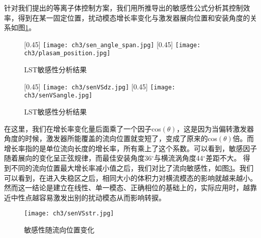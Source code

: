 针对我们提出的等离子体控制方案，我们用所推导出的敏感性公式分析其控制效率，得到在某一固定位置，扰动模态增长率变化与激发器展向位置和安装角度的关系如图\ref{f:senVSangle_span}。
\begin{figure}[htb]
  \centering
  [0.45\textwidth]
  {\texttt{[image: ch3/sen\_angle\_span.jpg]}}
  [0.45\textwidth]
  {\texttt{[image: ch3/plasam\_position.jpg]}}
  \caption{LST敏感性分析结果}\label{f:senVSangle_span}
\end{figure}
\begin{figure}[htb]
  \centering
  [0.45\textwidth]
  {\texttt{[image: ch3/senVSdz.jpg]}}
  [0.45\textwidth]
  {\texttt{[image: ch3/senVSangle.jpg]}}
  \caption{LST敏感性分析结果}\label{f:senVSangle_span2}
\end{figure}
在这里，我们在增长率变化量后面乘了一个因子cos$(\theta)$，这是因为当偏转激发器角度的时候，激发器所能覆盖的流向位置就变短了，变成了原来的cos$(\theta)$倍。而增长率指的是单位流向长度的增长率，所有乘上了这个系数。可以看到，敏感因子随着展向的变化呈正弦规律，而最佳安装角度36$^\circ$与横流涡角度44$^\circ$差距不大。
得到不同的流向位置最大增长率减小值之后，我们对比了流向敏感性，如图\ref{f:senVSstr}。我们可以看到，在进入失稳区之后，相同大小的体积力对横流模态的影响就越来越小。然而这一结论是建立在线性、单一模态、正确相位的基础上的，实际应用时，越靠近中性点越容易激发出别的扰动模态从而影响转捩。
\begin{figure}
  \centering
  \texttt{[image: ch3/senVSstr.jpg]}
  \caption{敏感性随流向位置变化}\label{f:senVSstr}
\end{figure}

